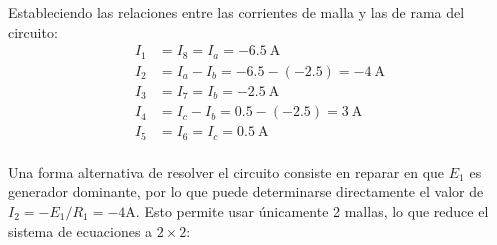 Estableciendo las relaciones entre las corrientes de malla y las de rama del circuito:
\begin{align*}
  I_1&=I_8=I_a= \boxed{\qty{-6.5}{\ampere}}\\
  I_2&=I_a-I_b=-6.5-(-2.5)= \boxed{\qty{-4}{\ampere}}\\
  I_3&=I_7=I_b= \boxed{\qty{-2.5}{\ampere}}\\
  I_4&=I_c-I_b=0.5-(-2.5)= \boxed{\qty{3}{\ampere}}\\
  I_5&=I_6=I_c= \boxed{\qty{0.5}{\ampere}}\\
\end{align*}

\vspace{-2mm}
Una forma alternativa de resolver el circuito consiste en reparar en que $E_1$ es generador dominante, por lo que puede determinarse directamente el valor de $I_2 = - E_1 / R_1 = -4\si{\ampere}$. Esto permite usar únicamente 2 mallas, lo que reduce el sistema de ecuaciones a $2\times 2$: 

